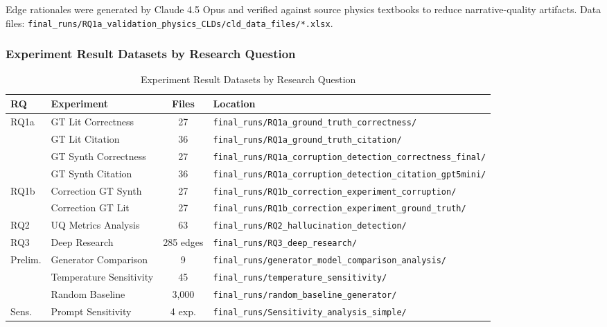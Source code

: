 Edge rationales were generated by Claude 4.5 Opus and verified against source physics textbooks to reduce narrative-quality artifacts. Data files: \texttt{final\_runs/RQ1a\_validation\_physics\_CLDs/cld\_data\_files/*.xlsx}.

\subsubsection{Experiment Result Datasets by Research Question}

\begin{table}[H]
\centering
\caption{Experiment Result Datasets by Research Question}
\label{tab:experiment_datasets}
\footnotesize
\begin{tabularx}{\textwidth}{@{}l l c X@{}}
\toprule
\textbf{RQ} & \textbf{Experiment} & \textbf{Files} & \textbf{Location} \\
\midrule
\multirow{4}{*}{RQ1a} 
  & GT Lit Correctness & 27 & \texttt{final\_runs/RQ1a\_ground\_truth\_correctness/} \\
  & GT Lit Citation & 36 & \texttt{final\_runs/RQ1a\_ground\_truth\_citation/} \\
  & GT Synth Correctness & 27 & \texttt{final\_runs/RQ1a\_corruption\_detection\_correctness\_final/} \\
  & GT Synth Citation & 36 & \texttt{final\_runs/RQ1a\_corruption\_detection\_citation\_gpt5mini/} \\
\midrule
\multirow{2}{*}{RQ1b}
  & Correction GT Synth & 27 & \texttt{final\_runs/RQ1b\_correction\_experiment\_corruption/} \\
  & Correction GT Lit & 27 & \texttt{final\_runs/RQ1b\_correction\_experiment\_ground\_truth/} \\
\midrule
RQ2 & UQ Metrics Analysis & 63 & \texttt{final\_runs/RQ2\_hallucination\_detection/} \\
\midrule
RQ3 & Deep Research & 285 edges & \texttt{final\_runs/RQ3\_deep\_research/} \\
\midrule
\multirow{3}{*}{Prelim.}
  & Generator Comparison & 9 & \texttt{final\_runs/generator\_model\_comparison\_analysis/} \\
  & Temperature Sensitivity & 45 & \texttt{final\_runs/temperature\_sensitivity/} \\
  & Random Baseline & 3,000 & \texttt{final\_runs/random\_baseline\_generator/} \\
\midrule
Sens. & Prompt Sensitivity & 4 exp. & \texttt{final\_runs/Sensitivity\_analysis\_simple/} \\
\bottomrule
\end{tabularx}
\end{table}

